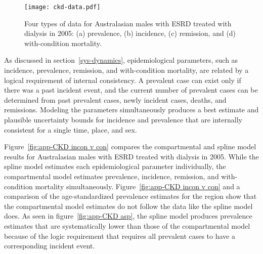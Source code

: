
    \begin{figure}[h]
        \begin{center}
            \texttt{[image: ckd-data.pdf]}
            \caption[Systematic review data for end-stage renal disease 
              treated with dialysis.]{Four types of data for Australasian 
              males with ESRD treated with dialysis
              in 2005: (a) prevalence, (b) incidence, (c)
              remission, and (d) with-condition mortality.}
            \label{fig:app-CKD data}
        \end{center}
    \end{figure}

As discussed in section~\ref{sys-dynamics}, epidemiological parameters,
such as incidence, prevalence, remission, and with-condition
mortality, are related by a logical requirement of internal
consistency.  A prevalent case can exist only if there was a past
incident event, and the current number of prevalent cases can be
determined from past prevalent cases, newly incident cases, deaths, and
remissions.  Modeling the parameters simultaneously produces a best
estimate and plausible uncertainty bounds for incidence and prevalence
that are internally consistent for a single time, place, and sex.

Figure~\ref{fig:app-CKD incon v con} compares the compartmental and
spline model results for Australasian males with
ESRD treated with dialysis in 2005.  While the spline model estimates each
epidemiological parameter individually, the compartmental model estimates
prevalence, incidence, remission, and with-condition mortality
simultaneously.  Figure~\ref{fig:app-CKD incon v con} and a
comparison of the age-standardized prevalence estimates for the region
show that the compartmental model estimates do not follow the data
like the spline model does.  As seen in figure~\ref{fig:app-CKD asp}, the
spline model produces prevalence estimates that are systematically lower
than those of the compartmental model because of the logic requirement that
requires all prevalent cases to have a corresponding incident event.

